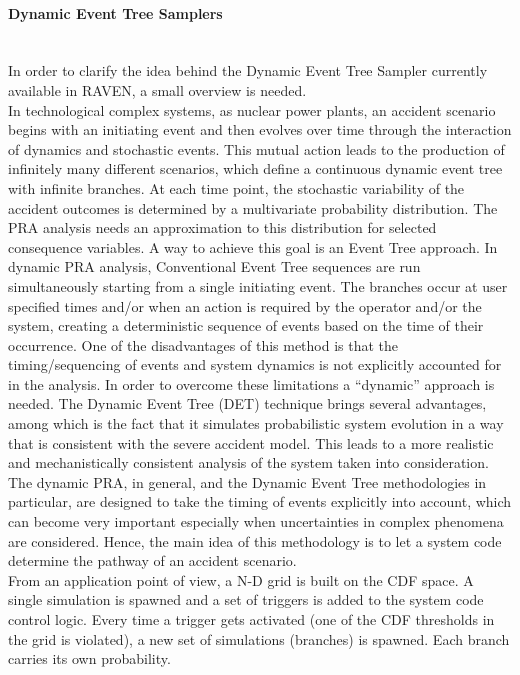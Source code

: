 \paragraph{Dynamic Event Tree Samplers}~\\
In order to clarify the idea behind the Dynamic Event Tree Sampler currently available in RAVEN, a small overview is 
needed.
\\In technological complex systems, as nuclear power plants, an accident scenario begins with an initiating event and then 
evolves over time through the interaction of dynamics and stochastic events. This mutual action leads to the production of 
infinitely many different scenarios, which define a continuous dynamic event tree with infinite branches. At each time point, 
the stochastic variability of the accident outcomes is determined by a multivariate probability distribution. The PRA analysis 
needs an approximation to this distribution for selected consequence variables. A way to achieve this goal is an Event Tree 
approach. In dynamic PRA analysis, Conventional Event Tree sequences are run simultaneously starting from a single 
initiating event. The branches occur at user specified times and/or when an action is required by the operator and/or the 
system, creating a deterministic sequence of events based on the time of their occurrence. One of the disadvantages of 
this method is that the timing/sequencing of events and system dynamics is not explicitly accounted for in the analysis. In 
order to overcome these limitations a “dynamic” approach is needed. The Dynamic Event Tree (DET) technique brings 
several advantages, among which is the fact that it simulates probabilistic system evolution in a way that is consistent with 
the severe accident model. This leads to a more realistic and mechanistically consistent analysis of the system taken into 
consideration. The dynamic PRA, in general, and the Dynamic Event Tree methodologies in particular, are designed to 
take the timing of events explicitly into account, which can become very important especially when uncertainties in complex 
phenomena are considered. Hence, the main idea of this methodology is to let a system code determine the pathway of an 
accident scenario.
\\From an application point of view, a N-D grid is built on the CDF space. A single simulation is spawned and a set of 
triggers is added to the system code control logic. Every time a trigger gets activated (one of the CDF thresholds in the grid 
is violated), a new set of simulations (branches) is spawned. Each branch carries its own probability.
